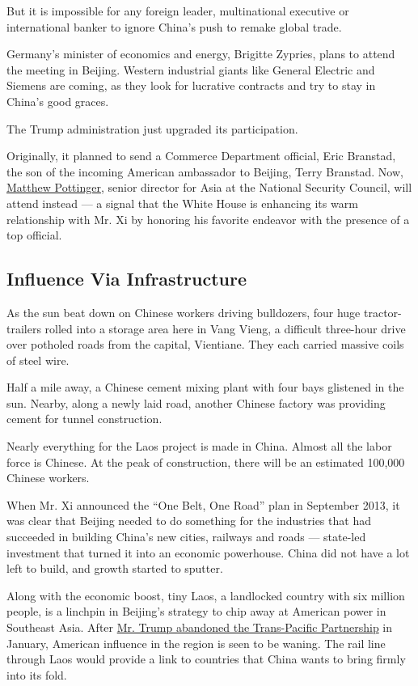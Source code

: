 But it is impossible for any foreign leader, multinational executive or
international banker to ignore China's push to remake global trade.

Germany's minister of economics and energy, Brigitte Zypries, plans to
attend the meeting in Beijing. Western industrial giants like General
Electric and Siemens are coming, as they look for lucrative contracts
and try to stay in China's good graces.

The Trump administration just upgraded its participation.

Originally, it planned to send a Commerce Department official, Eric
Branstad, the son of the incoming American ambassador to Beijing, Terry
Branstad. Now,
\href{https://www.nytimes3xbfgragh.onion/2017/04/04/world/asia/matthew-pottinger-trump-china.html}{Matthew
Pottinger}, senior director for Asia at the National Security Council,
will attend instead --- a signal that the White House is enhancing its
warm relationship with Mr. Xi by honoring his favorite endeavor with the
presence of a top official.

\hypertarget{influence-via-infrastructure}{%
\subsection{Influence Via
Infrastructure}\label{influence-via-infrastructure}}

As the sun beat down on Chinese workers driving bulldozers, four huge
tractor-trailers rolled into a storage area here in Vang Vieng, a
difficult three-hour drive over potholed roads from the capital,
Vientiane. They each carried massive coils of steel wire.

Half a mile away, a Chinese cement mixing plant with four bays glistened
in the sun. Nearby, along a newly laid road, another Chinese factory was
providing cement for tunnel construction.

Nearly everything for the Laos project is made in China. Almost all the
labor force is Chinese. At the peak of construction, there will be an
estimated 100,000 Chinese workers.

When Mr. Xi announced the ``One Belt, One Road'' plan in September 2013,
it was clear that Beijing needed to do something for the industries that
had succeeded in building China's new cities, railways and roads ---
state-led investment that turned it into an economic powerhouse. China
did not have a lot left to build, and growth started to sputter.

Along with the economic boost, tiny Laos, a landlocked country with six
million people, is a linchpin in Beijing's strategy to chip away at
American power in Southeast Asia. After
\href{https://www.nytimes3xbfgragh.onion/2017/01/23/us/politics/tpp-trump-trade-nafta.html}{Mr.
Trump abandoned the Trans-Pacific Partnership} in January, American
influence in the region is seen to be waning. The rail line through Laos
would provide a link to countries that China wants to bring firmly into
its fold.

